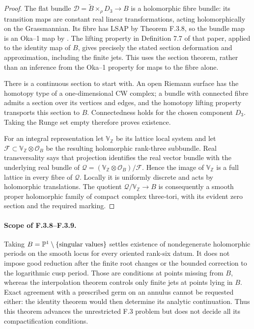\begin{proof}
The flat bundle
$\mathscr D=\widetilde B\times_\rho D_3\to B$ is a holomorphic
fibre bundle: its transition maps are constant real linear
transformations, acting holomorphically on the Grassmannian.
Its fibre has LSAP by Theorem F.3.8, so the bundle map is an
Oka--1 map by \cite[Proposition 7.13(d)]{ffAlarconForstneric25}.
The lifting property in Definition 7.7 of that paper, applied
to the identity map of $B$, gives precisely the stated section
deformation and approximation, including the finite jets.
This uses the section theorem, rather than an inference from
the Oka--1 property for maps to the fibre alone.

There is a continuous section to start with.  An open Riemann
surface has the homotopy type of a one-dimensional CW complex;
a bundle with connected fibre admits a section over its vertices
and edges, and the homotopy lifting property transports this
section to $B$.  Connectedness holds for the chosen component
$D_3$.  Taking the Runge set empty therefore proves existence.

For an integral representation let $\mathbb V_\mathbb Z$ be its
lattice local system and let $\mathcal F\subset
\mathbb V_\mathbb Z\otimes\mathcal O_B$ be the resulting
holomorphic rank-three subbundle.  Real transversality says that
projection identifies the real vector bundle with the underlying
real bundle of
$\mathcal Q=(\mathbb V_\mathbb Z\otimes\mathcal O_B)/\mathcal F$.
Hence the image of $\mathbb V_\mathbb Z$ is a full lattice in
every fibre of $\mathcal Q$.  Locally it is uniformly discrete
and acts by holomorphic translations.  The quotient
$\mathcal Q/\mathbb V_\mathbb Z\to B$ is consequently a smooth
proper holomorphic family of compact complex three-tori,
with its evident zero section and the required marking.
\end{proof}

\paragraph{Scope of F.3.8--F.3.9.}
Taking $B=\mathbb P^1\setminus\{\hbox{singular values}\}$
settles existence of nondegenerate holomorphic periods on the
smooth locus for every oriented rank-six datum.  It does not
impose good reduction after the finite root changes or the bounded
correction to the logarithmic cusp period.  Those are conditions
at points missing from $B$, whereas the interpolation theorem
controls only finite jets at points lying in $B$.  Exact agreement
with a prescribed germ on an annulus cannot be requested either:
the identity theorem would then determine its analytic continuation.
Thus this theorem advances the unrestricted F.3 problem but does
not decide all its compactification conditions.

